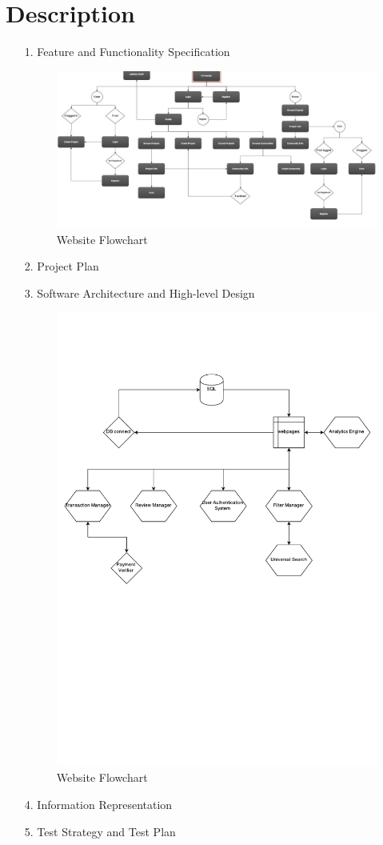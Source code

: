\documentclass[12pt]{article}
\begin{document}
\section*{Description}
\begin{enumerate}
\item[1.] Feature and Functionality Specification
\begin{figure}[ht!]
\centering
\includegraphics[width=200mm]{flowchart.jpg}
\caption{Website Flowchart \label{overflow}}
\end{figure}

\item[2.] Project Plan 
\item[3.] Software Architecture and High-level Design
\begin{figure}[ht!]
\centering
\includegraphics[width=200mm]{swag.pdf}
\caption{Website Flowchart \label{overflow}}
\end{figure}

\item[4.] Information Representation
\item[5.] Test Strategy and Test Plan	
\end{enumerate}
\end{document}
